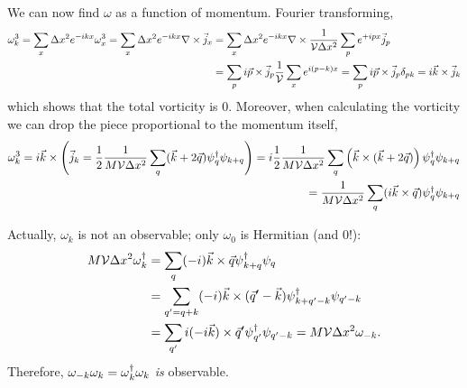 We can now find $\omega$ as a function of momentum.
Fourier transforming,
\begin{align}
	\omega^3_k
	= \sum_x \Delta x^2 e^{-ikx} \omega^3_x
	= \sum_x \Delta x^2 e^{-ikx} \nabla \times \vec{j}_x
	&= \sum_x \Delta x^2 e^{-ikx} \nabla \times \frac{1}{\mathcal{V} \Delta x^2} \sum_p e^{+ipx} \vec{j}_p
\nonumber\\
	&= \sum_p i\vec{p} \times \vec{j}_p \frac{1}{\mathcal{V}} \sum_x e^{i(p-k)x}
	= \sum_p i\vec{p} \times \vec{j}_p \delta_{pk}
	= i \vec{k} \times \vec{j}_k
\end{align}
which shows that the total vorticity is 0.
Moreover, when calculating the vorticity we can drop the piece proportional to the momentum itself,
\begin{align}
	\omega^3_k
	= i \vec{k} \times \left(\vec{j}_k = \frac{1}{2}\frac{1}{M \mathcal{V}\Delta x^2} \sum_q (\vec{k}+2\vec{q}) \psi{}^{\dagger}_{q} \psi_{k+q}\right)
	= i \frac{1}{2}\frac{1}{M \mathcal{V}\Delta x^2} \sum_q \left(\vec{k} \times (\vec{k}+2\vec{q})\right) \psi{}^{\dagger}_{q} \psi_{k+q}
\nonumber\\
	= \frac{1}{M \mathcal{V}\Delta x^2} \sum_q (i\vec{k} \times \vec{q}) \psi{}^{\dagger}_{q} \psi_{k+q}
\end{align}

Actually, $\omega_k$ is not an observable; only $\omega_0$ is Hermitian (and 0!):
\begin{align}
    M\mathcal{V} \Delta x^2 \omega{}^{\dagger}_k
    &= \sum_q (-i) \vec{k} \times \vec{q} \psi{}^{\dagger}_{k+q} \psi_{q}
    \nonumber\\
    &= \sum_{q' = q+k} (-i) \vec{k} \times (\vec{q}' - \vec{k}) \psi{}^{\dagger}_{k+q'-k} \psi_{q'-k}
    \nonumber\\
    &= \sum_{q'} i (-i\vec{k}) \times \vec{q}' \psi{}^{\dagger}_{q'} \psi_{q'-k} = M \mathcal{V} \Delta x^2 \omega_{-k}.
\end{align}
Therefore, $\omega_{-k} \omega_{k} = \omega{}^{\dagger}_k \omega_k$ \emph{is} observable.

